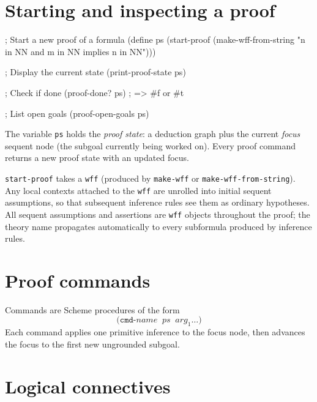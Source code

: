 \documentclass{amsbook}[openany]
\theoremstyle{definition}
\theoremstyle{remark}
\theoremstyle{remark}
\begin{document}
\section{Starting and inspecting a proof}

\begin{VNBcode}
; Start a new proof of a formula
(define ps (start-proof (make-wff-from-string "n in NN and m in NN implies n in NN")))

; Display the current state
(print-proof-state ps)

; Check if done
(proof-done? ps)   ; => #f or #t

; List open goals
(proof-open-goals ps)
\end{VNBcode}

The variable \texttt{ps} holds the \emph{proof state}: a deduction graph
plus the current \emph{focus} sequent node (the subgoal currently being
worked on).  Every proof command returns a new proof state with an
updated focus.

\texttt{start-proof} takes a \texttt{wff} (produced by \texttt{make-wff} or \texttt{make-wff-from-string}).
Any local contexts attached to the \texttt{wff} are unrolled into initial
sequent assumptions, so that subsequent inference rules see them as
ordinary hypotheses.  All sequent assumptions and assertions are
\texttt{wff} objects throughout the proof; the theory name propagates
automatically to every subformula produced by inference rules.

\section{Proof commands}
\label{sec:commands}

Commands are Scheme procedures of the form
\[
  \texttt{(cmd-}\mathit{name}\;\; \mathit{ps}\;\; \mathit{arg}_1 \ldots\texttt{)}
\]
Each command applies one primitive inference to the focus node, then
advances the focus to the first new ungrounded subgoal.

\section{Logical connectives}
\end{document}
